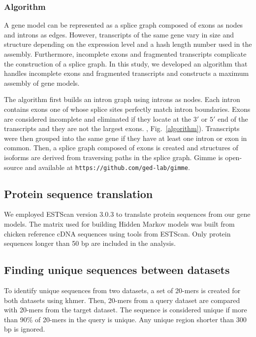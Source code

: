 \documentclass[10pt]{article}
\begin{document}
\subsubsection*{Algorithm}

A gene model can be represented as a splice graph composed of exons as nodes and
introns as edges.  However, transcripts of the same gene vary in size and
structure depending on the expression level and a hash length number used in
the assembly.  Furthermore, incomplete exons and fragmented transcripts complicate
the construction of a splice graph.  In this study, we developed an algorithm
that handles incomplete exons and fragmented transcripts and constructs a
maximum assembly of gene models.

The algorithm first builds an intron graph using introns as nodes.  Each intron
contains exons one of whose splice sites perfectly match intron boundaries.
Exons are considered incomplete and eliminated if they locate at the $3'$ or
$5'$ end of the transcripts and they are not the largest exons.  ,
Fig.~\ref{algorithm}).  Transcripts were then grouped into the same gene if
they have at least one intron or exon in common.  Then, a splice graph composed
of exons is created and structures of isoforms are derived from traversing
paths in the splice graph.  Gimme is open-source and available at
\texttt{https://github.com/ged-lab/gimme}.

\subsection*{Protein sequence translation}

We employed ESTScan version 3.0.3 to translate protein sequences from our gene
models.  The matrix used for building Hidden Markov models was built from chicken
reference cDNA sequences using tools from ESTScan. Only protein sequences longer
than 50 bp are included in the analysis.

\subsection*{Finding unique sequences between datasets}

To identify unique sequences from two datasets, a set of 20-mers is created for
both datasets using khmer\cite{khmer}.  Then, 20-mers from a query dataset are
compared with 20-mers from the target dataset.  The sequence is considered
unique if more than 90\% of 20-mers in the query is unique.  Any unique region
shorter than 300 bp is ignored.
\end{document}
